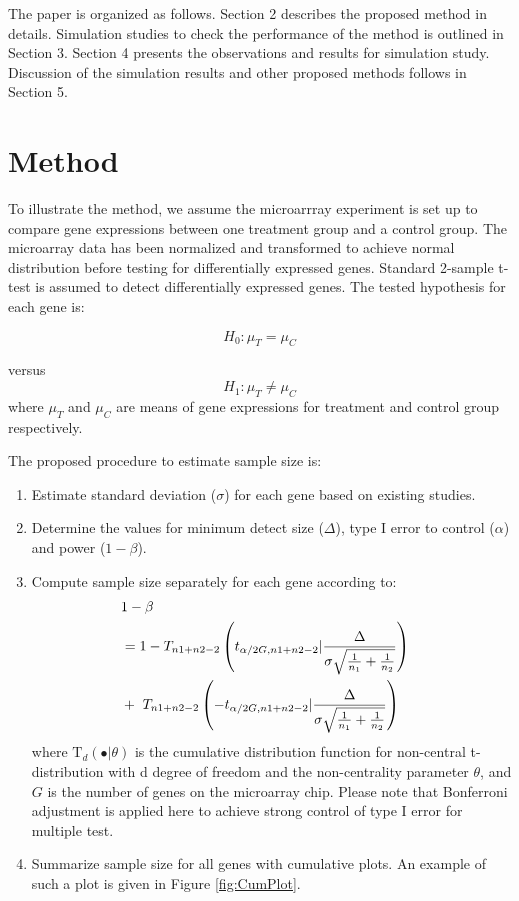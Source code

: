 \documentclass{bioinfo}
\begin{document}
The paper is organized as follows. Section 2 describes the proposed method in details. Simulation studies to check the
performance of the method is outlined in Section 3. Section 4 presents the observations and results for simulation study.
Discussion of the simulation results and other proposed methods follows in Section 5.

\section{Method}
To illustrate the method, we assume the microarrray experiment is
set up to compare gene expressions between one treatment group and
a control group. The microarray data has been normalized and
transformed to achieve normal distribution before testing for
differentially expressed genes. Standard 2-sample t-test is
assumed to detect differentially expressed genes. The tested
hypothesis for each gene is:

\begin{equation}
H_0: \mu_{T} = \mu_{C}  \nonumber
\end{equation}

versus
\begin{equation}
H_1: \mu_{T} \neq \mu_{C} \nonumber
\end{equation}
%
where $\mu_{T}$ and $\mu_{C}$ are means of gene expressions for treatment and control group respectively.

The proposed procedure to estimate sample size is:

\begin{enumerate}
\item{Estimate standard deviation ($\sigma$) for each gene based
on existing studies.}

\item{Determine the values for minimum detect size ($\Delta$), type I error to control ($\alpha$) and power ($1 - \beta$).}

\item{Compute sample size separately for each gene according to:}
\begin{eqnarray}
\lefteqn{1-\beta}  \nonumber \\
&= 1-T_{n1+n2-2} \left( t_{\alpha/2G,n1+n2-2} | \frac{\Delta}{\sigma \sqrt{\frac{1}{n_1} + \frac{1}{n_2}}}\right) \nonumber \\
& +~T_{n1+n2-2} \left( -t_{\alpha/2G,n1+n2-2} | \frac{\Delta}{\sigma \sqrt{\frac{1}{n_1} + \frac{1}{n_2}}}\right)
            \label{eq:formula}
\end{eqnarray}
%
where $\mathrm{T}_{d}(\bullet|\theta)$ is the cumulative
distribution function for non-central t-distribution with d degree
of freedom and the non-centrality parameter $\theta$, and $G$ is
the number of genes on the microarray chip. Please note that
Bonferroni adjustment is applied here to achieve strong control of
type I error for multiple test.

\item{Summarize sample size for all genes with cumulative plots. An example of such a plot is given in Figure
\ref{fig:CumPlot}.}

\end{enumerate}
\end{document}
